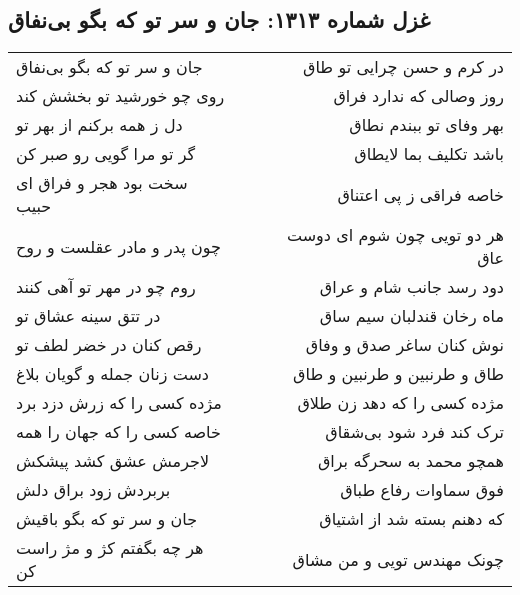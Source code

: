 \begin{center}
\section*{غزل شماره ۱۳۱۳: جان و سر تو که بگو بی‌نفاق}
\label{sec:1313}
\begin{longtable}{l p{0.5cm} r}
جان و سر تو که بگو بی‌نفاق
&&
در کرم و حسن چرایی تو طاق
\\
روی چو خورشید تو بخشش کند
&&
روز وصالی که ندارد فراق
\\
دل ز همه برکنم از بهر تو
&&
بهر وفای تو ببندم نطاق
\\
گر تو مرا گویی رو صبر کن
&&
باشد تکلیف بما لایطاق
\\
سخت بود هجر و فراق ای حبیب
&&
خاصه فراقی ز پی اعتناق
\\
چون پدر و مادر عقلست و روح
&&
هر دو تویی چون شوم ای دوست عاق
\\
روم چو در مهر تو آهی کنند
&&
دود رسد جانب شام و عراق
\\
در تتق سینه عشاق تو
&&
ماه رخان قندلبان سیم ساق
\\
رقص کنان در خضر لطف تو
&&
نوش کنان ساغر صدق و وفاق
\\
دست زنان جمله و گویان بلاغ
&&
طاق و طرنبین و طرنبین و طاق
\\
مژده کسی را که زرش دزد برد
&&
مژده کسی را که دهد زن طلاق
\\
خاصه کسی را که جهان را همه
&&
ترک کند فرد شود بی‌شقاق
\\
لاجرمش عشق کشد پیشکش
&&
همچو محمد به سحرگه براق
\\
بربردش زود براق دلش
&&
فوق سماوات رفاع طباق
\\
جان و سر تو که بگو باقیش
&&
که دهنم بسته شد از اشتیاق
\\
هر چه بگفتم کژ و مژ راست کن
&&
چونک مهندس تویی و من مشاق
\\
\end{longtable}
\end{center}

